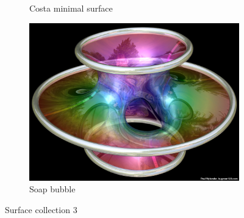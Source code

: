 \begin{figure}
\begin{subfigure}{0.5\textwidth}
    \caption{Costa minimal surface}
\end{subfigure}
\begin{subfigure}{0.4\textwidth}
    \centering
    \includegraphics[width=\textwidth]{picture/week4/Costa-large.jpg}
    \caption{Soap bubble}
\end{subfigure}
\caption*{Surface collection 3}
\end{figure}

